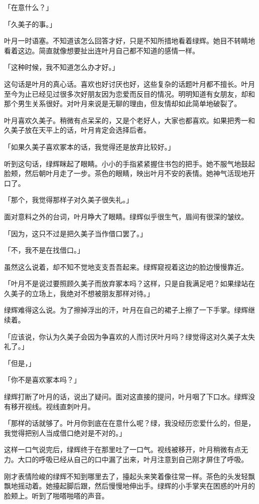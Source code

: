 \documentclass[UTF8]{ctexart}
\begin{document}
    「在意什么？」

    「久美子的事。」

    叶月一时语塞。不知道该怎么回答才好，只是不知所措地看着绿辉。她目不转睛地看着这边。简直就像想要扯出连叶月自己都不知道的感情一样。

    「这种时候，我不知道怎么办才好。」

    这句话是叶月的真心话。喜欢也好讨厌也好，这些复杂的话题叶月都不擅长。叶月至今为止已经见过很多次好朋友因为恋爱而反目的情况。明明知道有女朋友，却和那个男生关系很好。对叶月来说是无聊的理由，但友情却如此简单地破裂了。

    叶月喜欢久美子。稍微有点呆呆的，又是个老好人，大家也都喜欢。如果把秀一和久美子放在天平上的话，叶月肯定会选择后者。

    「如果久美子喜欢冢本的话，我觉得还是放弃比较好。」

    听到这句话，绿辉眯起了眼睛。小小的手指紧紧握住书包的把手。她不服气地鼓起脸颊，然后朝叶月走了一步。茶色的眼睛，映出叶月不安的表情。她神气活现地开口了。

    「那个，我觉得那样子对久美子很失礼。」

    面对意料之外的台词，叶月睁大了眼睛。绿辉似乎很生气，眉间有很深的皱纹。

    「因为，这只不过是把久美子当作借口罢了。」

    「不，我不是在找借口。」

    虽然这么说着，却不知不觉地支支吾吾起来。绿辉窥视着这边的脸边慢慢靠近。

    「叶月不是说过要照顾久美子而放弃冢本吗？这样，只是自我满足吧？如果绿站在久美子的立场上，我绝对不想被朋友那样对待。」

    绿辉难得这么说。为了擦掉浮出的汗，叶月在自己的裙子上擦了一下手掌。绿辉继续着。

    「应该说，你认为久美子会因为争喜欢的人而讨厌叶月吗？绿觉得这对久美子太失礼了。」

    「但是，」

    「你不是喜欢冢本吗？」

    绿辉打断了叶月的话，说出了疑问。面对这直接的提问，叶月咽了下口水。绿辉没有移开视线。视线直刺叶月。

    「那样的话就够了。叶月你到底在在意什么呢？绿，我没经历恋爱什么的，但是，我觉得把别人当成借口绝对是不对的。」

    这样一口气说完后，绿辉终于在那里吐了一口气。视线被移开，叶月稍微有点无力。大口的呼吸已经从自己的口中漏了出来，叶月注意到自己刚才屏住了呼吸。

    刚才表情险峻的绿辉不知到哪里去了，擡起头来笑着像往常一样。茶色的头发轻飘飘地摇动着。她擡起脚后跟，然后慢慢地伸出手。绿辉的小手掌夹在困惑的叶月的脸颊上。听到了啪嗒啪嗒的声音。
\end{document}
